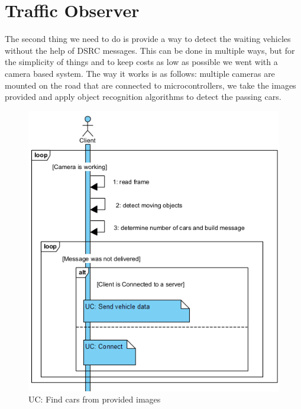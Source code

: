 \documentclass[17pt]{report}
\begin{document}
\pagebreak

\section{Traffic Observer}
\indent \indent
The second thing we need to do is provide a way to detect the
waiting vehicles without the help of DSRC messages. This can be
done in multiple ways, but for the simplicity of things and to keep
costs as low as possible we went with a camera based system.
The way it works is as follows: multiple cameras are mounted on the road 
that are connected to microcontrollers, we take the images provided and 
apply object recognition algorithms to detect the passing cars.

\begin{figure}[h!]
    \includegraphics[width=\textwidth]{UC/ProcessImageAndFindTheCars.png}
    \caption{UC: Find cars from provided images}
    \label{fig:UC_FindCars}
\end{figure}
\end{document}
